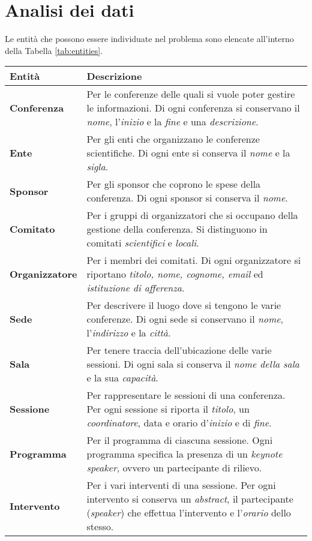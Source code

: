\section{Analisi dei dati}
Le entità che possono essere individuate nel problema sono elencate all'interno della Tabella \ref{tab:entities}.
\begin{table}[h!]
\begin{tabularx}{\textwidth}{|l|X|}
\hline
\textbf{Entità} & \textbf{Descrizione} \\
\hline
\textbf{Conferenza} & Per le conferenze delle quali si vuole poter gestire le informazioni. Di ogni conferenza si conservano il \textit{nome}, l'\textit{inizio} e la \textit{fine} e una \textit{descrizione}. \\ \hline
\textbf{Ente} & Per gli enti che organizzano le conferenze scientifiche. Di ogni ente si conserva il \textit{nome} e la \textit{sigla}. \\ \hline
\textbf{Sponsor} & Per gli sponsor che coprono le spese della conferenza. Di ogni sponsor si conserva il \textit{nome}.\\ \hline
\textbf{Comitato} & Per i gruppi di organizzatori che si occupano della gestione della conferenza. Si distinguono in comitati \textit{scientifici} e \textit{locali}. \\ \hline
\textbf{Organizzatore} & Per i membri dei comitati. Di ogni organizzatore si riportano \textit{titolo, nome, cognome, email} ed \textit{istituzione di afferenza}. \\ \hline
\textbf{Sede} & Per descrivere il luogo dove si tengono le varie conferenze. Di ogni sede si conservano il \textit{nome}, l'\textit{indirizzo} e la \textit{città}.\\ \hline
\textbf{Sala} & Per tenere traccia dell'ubicazione delle varie sessioni. Di ogni sala si conserva il \textit{nome della sala} e la sua \textit{capacità}. \\ \hline
\textbf{Sessione} & Per rappresentare le sessioni di una conferenza. Per ogni sessione si riporta il \textit{titolo}, un \textit{coordinatore}, data e orario d'\textit{inizio} e di \textit{fine}. \\ \hline
\textbf{Programma} & Per il programma di ciascuna sessione. Ogni programma specifica la presenza di un \textit{keynote speaker}, ovvero un partecipante di rilievo. \\ \hline
\textbf{Intervento} & Per i vari interventi di una sessione. Per ogni intervento si conserva un \textit{abstract}, il partecipante (\textit{speaker}) che effettua l'intervento e l'\textit{orario} dello stesso. \\ \hline

\end{tabularx}
\end{table}
